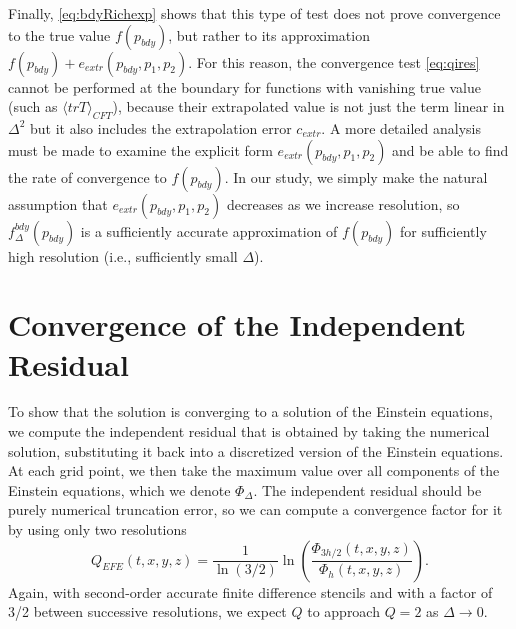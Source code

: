 \documentclass[a4paper,11pt]{article}
\numberwithin{equation}{section}
\begin{document}
Finally, \eqref{eq:bdyRichexp} shows that this type of test does not prove convergence to the true value $f(p_{bdy})$, but rather to its approximation $f(p_{bdy})+e_{extr}(p_{bdy},p_1,p_2)$. For this reason, the convergence test \eqref{eq:qires} cannot be performed at the boundary for functions with vanishing true value (such as $\langle trT \rangle_{CFT}$), because their extrapolated value is not just the term linear in $\Delta^2$ but it also includes the extrapolation error $c_{extr}$. A more detailed analysis must be made to examine the explicit form $e_{extr}(p_{bdy},p_1,p_2)$ and be able to find the rate of convergence to $f(p_{bdy})$. In our study, we simply make the natural assumption that $e_{extr}(p_{bdy},p_1,p_2)$ decreases as we increase resolution, so  $f^{bdy}_{\Delta}(p_{bdy})$ is a sufficiently accurate approximation of $f(p_{bdy})$ for sufficiently high resolution (i.e., sufficiently small $\Delta$).


\section{Convergence of the Independent Residual}\label{sec:convbulk}

To show that the solution is converging to a solution of the Einstein equations, we compute the independent residual that is obtained by taking the numerical solution, substituting it back into a discretized version of the Einstein equations.
At each grid point, we then take the maximum value over all components of the Einstein equations, which we denote $\Phi_\Delta$. 
The independent residual should be purely numerical truncation error, so we can compute a convergence factor for it by using only two resolutions
\begin{equation}\label{eq:qires}
Q_{EFE}(t,x,y,z)=\frac{1}{\ln(3/2)}\ln\left( \frac{\Phi_{3h/2}(t,x,y,z)}{\Phi_{h}(t,x,y,z)} \right).
\end{equation}
Again, with second-order accurate finite difference stencils and with a factor of 3/2 between successive resolutions, we expect $Q$ to approach $Q=2$ as $\Delta\rightarrow0$.
\end{document}
